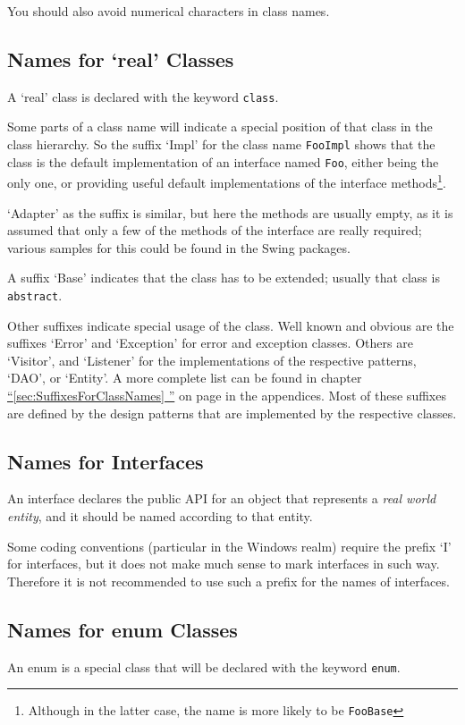 \documentclass[12pt,a4paper,titlepage, parskip=half, headsepline, footsepline, cleardoubleplain]{scrbook}
\newcommand*{\tqfullvref}[1]{\hyperref[{#1}]{“\ref*{#1} \nameref*{#1}”} on page \pageref{#1}}
\begin{document}
You should also avoid numerical characters in class names.

\subsection{Names for ‘real’ Classes}\label{sec:NamesForClasses}
A ‘real’ class is declared with the keyword \lstinline|class|. 

Some parts of a class name will indicate a special position of that class in the class hierarchy. So the suffix ‘Impl’ for the class name \lstinline|FooImpl| shows that the class is the default implementation of an interface named \lstinline|Foo|, either being the only one, or providing useful default implementations of the interface methods\footnote{Although in the latter case, the name is more likely to be \lstinline|FooBase|}.

‘Adapter’ as the suffix is similar, but here the methods are usually empty, as it is assumed that only a few of the methods of the interface are really required; various samples for this could be found in the Swing packages.

A suffix ‘Base’ indicates that the class has to be extended; usually that class is \lstinline|abstract|.

Other suffixes indicate special usage of the class. Well known and obvious are the suffixes ‘Error’ and ‘Exception’ for error and exception classes. Others are ‘Visitor’, and ‘Listener’ for the implementations of the respective patterns, ‘DAO’, or ‘Entity’. A more complete list can be found in chapter \tqfullvref{sec:SuffixesForClassNames} in the appendices. Most of these suffixes are defined by the design patterns that are implemented by the respective classes.

\subsection{Names for Interfaces}\label{sec:NamesForInterfaces}
An interface declares the public API for an object that represents a \textit{real world entity}, and it should be named according to that entity.

Some coding conventions (particular in the Windows realm) require the prefix ‘I’ for interfaces, but it does not make much sense to mark interfaces in such way. Therefore it is not recommended to use such a prefix for the names of interfaces.

\subsection{Names for enum Classes}\label{sec:NamesForEnumClasses}
An enum is a special class that will be declared with the keyword \lstinline|enum|.
\end{document}

